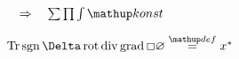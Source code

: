 \documentclass[12pt]{beamer}
\begin{document}
   $\ztoho \tsum \tprod \tint \const$

   $\tr \sgn \Laplace \rot \Div \grad \Dalembert \prumer \eqdef \conj x$
\end{document}
